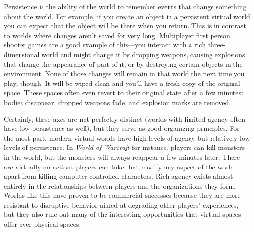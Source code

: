 Persistence is the ability of the world to remember events that change something about the world. For example, if you create an object in a persistent virtual world you can expect that the object will be there when you return. This is in contrast to worlds where changes aren’t saved for very long. Multiplayer first person shooter games are a good example of this---you interact with a rich three-dimensional world and might change it by dropping weapons, causing explosions that change the appearance of part of it, or by destroying certain objects in the environment. None of those changes will remain in that world the next time you play, though. It will be wiped clean and you’ll have a fresh copy of the original space. These spaces often even revert to their original state after a few minutes: bodies disappear, dropped weapons fade, and explosion marks are removed. 

Certainly, these axes are not perfectly distinct (worlds with limited agency often have low persistence as well), but they serve as good organizing principles. For the most part, modern virtual worlds have high levels of agency but relatively low levels of persistence. In \emph{World of Warcraft} for instance, players can kill monsters in the world, but the monsters will always reappear a few minutes later. There are virtually no actions players can take that modify any aspect of the world apart from killing computer controlled characters. Rich agency exists almost entirely in the relationships between players and the organizations they form. Worlds like this have proven to be commercial successes because they are more resistant to disruptive behavior aimed at degrading other players' experiences, but they also rule out many of the interesting opportunities that virtual spaces offer over physical spaces.

